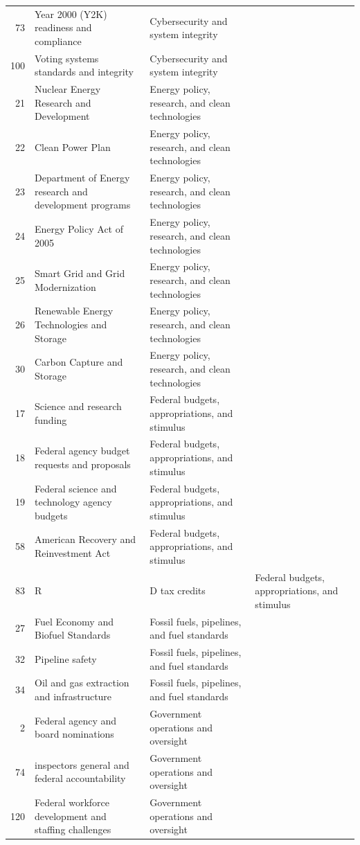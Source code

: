 \begin{longtable}{rll}
73 & Year 2000 (Y2K) readiness and compliance & Cybersecurity and system integrity \\
100 & Voting systems standards and integrity & Cybersecurity and system integrity \\
21 & Nuclear Energy Research and Development & Energy policy, research, and clean technologies \\
22 & Clean Power Plan & Energy policy, research, and clean technologies \\
23 & Department of Energy research and development programs & Energy policy, research, and clean technologies \\
24 & Energy Policy Act of 2005 & Energy policy, research, and clean technologies \\
25 & Smart Grid and Grid Modernization & Energy policy, research, and clean technologies \\
26 & Renewable Energy Technologies and Storage & Energy policy, research, and clean technologies \\
30 & Carbon Capture and Storage & Energy policy, research, and clean technologies \\
17 & Science and research funding & Federal budgets, appropriations, and stimulus \\
18 & Federal agency budget requests and proposals & Federal budgets, appropriations, and stimulus \\
19 & Federal science and technology agency budgets & Federal budgets, appropriations, and stimulus \\
58 & American Recovery and Reinvestment Act & Federal budgets, appropriations, and stimulus \\
83 & R&D tax credits & Federal budgets, appropriations, and stimulus \\
27 & Fuel Economy and Biofuel Standards & Fossil fuels, pipelines, and fuel standards \\
32 & Pipeline safety & Fossil fuels, pipelines, and fuel standards \\
34 & Oil and gas extraction and infrastructure & Fossil fuels, pipelines, and fuel standards \\
2 & Federal agency and board nominations & Government operations and oversight \\
74 & inspectors general and federal accountability & Government operations and oversight \\
120 & Federal workforce development and staffing challenges & Government operations and oversight \\

\end{longtable}

